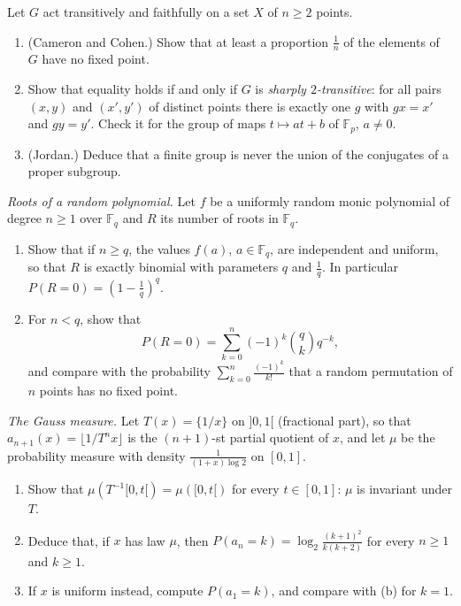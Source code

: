 \begin{exercise}[$\star\star$]\label{pb:derangements}
Let $G$ act transitively and faithfully on a set $X$ of $n\ge2$ points.
\begin{enumerate}[label=(\alph*)]
\item (Cameron and Cohen.) Show that at least a proportion $\frac1n$ of the elements of $G$ have no fixed point.
\item Show that equality holds if and only if $G$ is \emph{sharply $2$-transitive}: for all pairs $(x,y)$ and $(x',y')$ of
distinct points there is exactly one $g$ with $gx=x'$ and $gy=y'$. Check it for the group of maps $t\mapsto at+b$ of
$\mathbb F_p$, $a\ne0$.
\item (Jordan.) Deduce that a finite group is never the union of the conjugates of a proper subgroup.
\end{enumerate}
\end{exercise}

\begin{exercise}[$\star\star$]\label{pb:noroots}
\emph{Roots of a random polynomial.} Let $f$ be a uniformly random monic polynomial of degree $n\ge1$ over $\mathbb F_q$ and $R$ its
number of roots in $\mathbb F_q$.
\begin{enumerate}[label=(\alph*)]
\item Show that if $n\ge q$, the values $f(a)$, $a\in\mathbb F_q$, are independent and uniform, so that $R$ is exactly binomial
with parameters $q$ and $\frac1q$. In particular $P(R=0)=(1-\frac1q)^q$.
\item For $n<q$, show that
\[
P(R=0)=\sum_{k=0}^n(-1)^k\binom qk q^{-k},
\]
and compare with the probability $\sum_{k=0}^n\frac{(-1)^k}{k!}$ that a random permutation of $n$ points has no fixed point.
\end{enumerate}
\end{exercise}

\begin{exercise}[$\star$]\label{pb:gaussmeasure}
\emph{The Gauss measure.} Let $T(x)=\{1/x\}$ on $]0,1[$ (fractional part), so that $a_{n+1}(x)=\lfloor1/T^nx\rfloor$ is the
$(n+1)$-st partial quotient of $x$, and let $\mu$ be the probability measure with density $\frac1{(1+x)\log2}$ on $[0,1]$.
\begin{enumerate}[label=(\alph*)]
\item Show that $\mu(T^{-1}[0,t[)=\mu([0,t[)$ for every $t\in[0,1]$: $\mu$ is invariant under $T$.
\item Deduce that, if $x$ has law $\mu$, then $P(a_n=k)=\log_2\frac{(k+1)^2}{k(k+2)}$ for every $n\ge1$ and $k\ge1$.
\item If $x$ is uniform instead, compute $P(a_1=k)$, and compare with (b) for $k=1$.
\end{enumerate}
\end{exercise}

